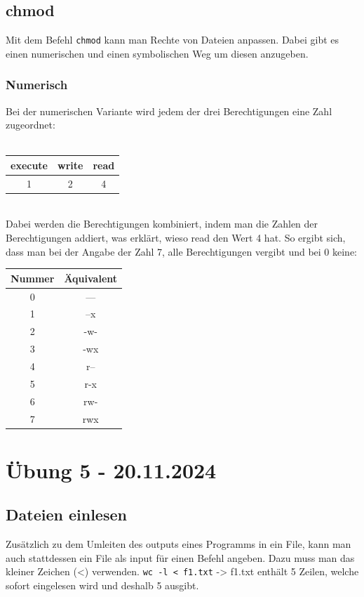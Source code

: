\documentclass{article}
\begin{document}
	\subsection{chmod}
	Mit dem Befehl \verb|chmod| kann man Rechte von Dateien anpassen. Dabei gibt es einen numerischen und einen symbolischen Weg um diesen anzugeben.
	\subsubsection{Numerisch}
	Bei der numerischen Variante wird jedem der drei Berechtigungen eine Zahl zugeordnet: \\ \\
	\begin{tabular}{| c | c | c |}
	 	\toprule
	 	execute & write & read \\ \midrule
	 	1 & 2 & 4 \\
	 	\bottomrule
	 \end{tabular} \\
	 Dabei werden die Berechtigungen kombiniert, indem man die Zahlen der Berechtigungen addiert, was erklärt, wieso read den Wert 4 hat. So ergibt sich, dass man bei der Angabe der Zahl 7, alle Berechtigungen vergibt und bei 0 keine: \\
	 \begin{tabular}{| c | c |}
	 	\toprule
	 	Nummer & Äquivalent\\ \midrule
	 	0 & --- \\
	 	1 & --x \\
	 	2 & -w- \\
	 	3 & -wx \\
	 	4 & r-- \\
	 	5 & r-x \\
	 	6 & rw- \\
	 	7 & rwx \\ \hline
	 \end{tabular}
	\section{Übung 5 - 20.11.2024}
	\subsection{Dateien einlesen}
	Zusätzlich zu dem Umleiten des outputs eines Programms in ein File, kann man auch stattdessen ein File als input für einen Befehl angeben. Dazu muss man das kleiner Zeichen (<) verwenden. \verb|wc -l < f1.txt| -> f1.txt enthält 5 Zeilen, welche sofort eingelesen wird und deshalb 5 ausgibt. 
\end{document}
